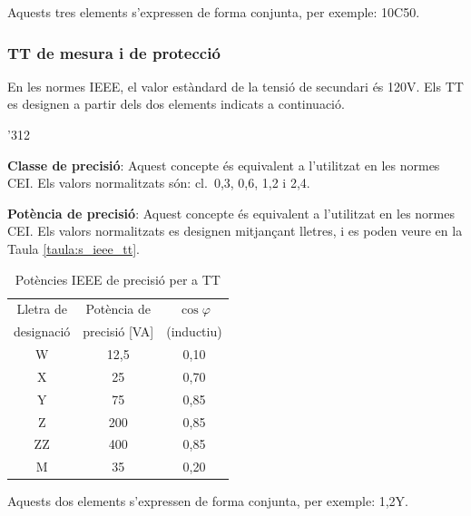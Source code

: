 Aquests tres elements s'expressen de forma conjunta, per exemple:
10C50.

\subsubsection{TT de mesura i de protecci\'{o}}

En les normes \textsf{IEEE}, el valor est\`{a}ndard de la tensi\'{o} de
secundari \'{e}s 120\unit{V}. Els TT es designen a partir dels dos
elements indicats a continuaci\'{o}.

\begin{dingautolist}{'312}
    \item \textbf{Classe de precisi\'{o}}: Aquest concepte \'{e}s equivalent
    a l'utilitzat en les normes \textsf{CEI}. Els valors
    normalitzats s\'{o}n: cl.~0,3, 0,6, 1,2 i 2,4.
    \item \textbf{Pot\`{e}ncia de precisi\'{o}}: Aquest concepte \'{e}s equivalent
    a l'utilitzat en les normes \textsf{CEI}. Els valors
    normalitzats es designen mitjan\c{c}ant lletres, i es poden veure en
    la Taula \vref{taula:s_ieee_tt}.

    \begin{table}[h]
    \caption{\label{taula:s_ieee_tt} Pot\`{e}ncies \textsf{IEEE} de precisi\'{o}  per a TT}
    \begin{center}\begin{tabular}{ccc}
    \toprule[1pt]
    Lletra de & Pot\`{e}ncia de & $\cos\varphi$\\
    designaci\'{o} &  precisi\'{o} [VA] &  (inductiu)\\
    \midrule
        W & 12,5 & 0,10\\
        X & 25 & 0,70 \\
        Y & 75 & 0,85 \\
        Z & 200 & 0,85 \\
        ZZ & 400 & 0,85 \\
        M & 35 & 0,20 \\
    \bottomrule[1pt]
    \end{tabular} \end{center}
    \end{table}
\end{dingautolist}

Aquests dos elements s'expressen de forma conjunta, per exemple:
1,2Y.\pagebreak


